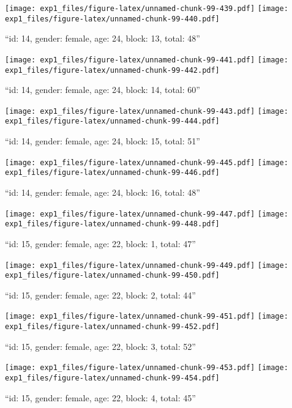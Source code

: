\documentclass[,]{article}
\begin{document}
\texttt{[image: exp1\_files/figure-latex/unnamed-chunk-99-439.pdf]}
\texttt{[image: exp1\_files/figure-latex/unnamed-chunk-99-440.pdf]}

\newpage
[1] 

``id: 14, gender: female, age: 24, block: 13, total: 48''

\texttt{[image: exp1\_files/figure-latex/unnamed-chunk-99-441.pdf]}
\texttt{[image: exp1\_files/figure-latex/unnamed-chunk-99-442.pdf]}

\newpage
[1] 

``id: 14, gender: female, age: 24, block: 14, total: 60''

\texttt{[image: exp1\_files/figure-latex/unnamed-chunk-99-443.pdf]}
\texttt{[image: exp1\_files/figure-latex/unnamed-chunk-99-444.pdf]}

\newpage
[1] 

``id: 14, gender: female, age: 24, block: 15, total: 51''

\texttt{[image: exp1\_files/figure-latex/unnamed-chunk-99-445.pdf]}
\texttt{[image: exp1\_files/figure-latex/unnamed-chunk-99-446.pdf]}

\newpage
[1] 

``id: 14, gender: female, age: 24, block: 16, total: 48''

\texttt{[image: exp1\_files/figure-latex/unnamed-chunk-99-447.pdf]}
\texttt{[image: exp1\_files/figure-latex/unnamed-chunk-99-448.pdf]}

\newpage
[1] 

``id: 15, gender: female, age: 22, block: 1, total: 47''

\texttt{[image: exp1\_files/figure-latex/unnamed-chunk-99-449.pdf]}
\texttt{[image: exp1\_files/figure-latex/unnamed-chunk-99-450.pdf]}

\newpage
[1] 

``id: 15, gender: female, age: 22, block: 2, total: 44''

\texttt{[image: exp1\_files/figure-latex/unnamed-chunk-99-451.pdf]}
\texttt{[image: exp1\_files/figure-latex/unnamed-chunk-99-452.pdf]}

\newpage
[1] 

``id: 15, gender: female, age: 22, block: 3, total: 52''

\texttt{[image: exp1\_files/figure-latex/unnamed-chunk-99-453.pdf]}
\texttt{[image: exp1\_files/figure-latex/unnamed-chunk-99-454.pdf]}

\newpage
[1] 

``id: 15, gender: female, age: 22, block: 4, total: 45''
\end{document}
